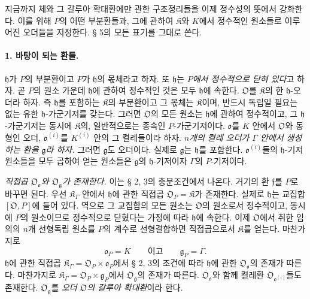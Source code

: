 지금까지 체와 그 갈루아 확대환에만 관한 구조정리들을 이제 정수성의 뜻에서 강화한다. 이를 위해 \(P\)의 어떤 부분환들과, 그에 관하여 \(\mathfrak K\)와 \(K\)에서 정수적인 원소들로 이루어진 오더들을 지정한다. § 5의 모든 표기를 그대로 쓴다.

\paragraph{1. 바탕이 되는 환들.}
\(\mathfrak h\)가 \(P\)의 부분환이고 \(P\)가 \(\mathfrak h\)의 몫체라고 하자. 또 \(\mathfrak h\)는 \emph{\(P\)에서 정수적으로 닫혀 있다}고 하자. 곧 \(P\)의 원소 가운데 \(\mathfrak h\)에 관하여 정수적인 것은 모두 \(\mathfrak h\)에 속한다. \(\mathfrak O\)를 \(\mathfrak K\)의 한 \(\mathfrak h\)-오더라 하자. 즉 \(\mathfrak h\)를 포함하는 \(\mathfrak K\)의 부분환이고 그 몫체는 \(\mathfrak K\)이며, 반드시 독립일 필요는 없는 유한 \(\mathfrak h\)-가군기저를 갖는다. 그러면 \(\mathfrak O\)의 모든 원소는 \(\mathfrak h\)에 관하여 정수적이고, 그 \(\mathfrak h\)-가군기저는 동시에 \(\mathfrak K\)의, 일반적으로는 종속인 \(P\)-가군기저이다. \(\mathfrak o\)를 \(K\) 안에서 \(\mathfrak O\)와 동형인 오더, \(\mathfrak o^{(i)}\)를 \(K^{(i)}\) 안의 그 켤레들이라 하자. \emph{\(n\)개의 켤레 오더가 \(\Gamma\) 안에서 생성하는 환을 \(\mathfrak g\)라 하자.} 그러면 \(\mathfrak g\)도 오더이다. 실제로 \(\mathfrak g\)는 \(\mathfrak h\)를 포함한다. \(\mathfrak o^{(i)}\)들의 \(\mathfrak h\)-기저 원소들을 모두 곱하여 얻는 원소들은 \(\mathfrak g\)의 \(\mathfrak h\)-기저이자 \(\Gamma\)의 \(P\)-기저이다.

\emph{직접곱 \(\mathfrak O_{\mathfrak o}\)와 \(\mathfrak O_{\mathfrak g}\)가 존재한다.} 이는 § 2, 3의 충분조건에서 나온다. 거기의 환 \(\mathfrak f\)를 \(P\)로 바꾸면 된다. 우선 \(\mathfrak K_\Gamma\) 안에서 \(\mathfrak h\)에 관한 직접곱 \(\mathfrak O_P=\mathfrak K\)가 존재한다. 실제로 \(\mathfrak h\)는 교집합 \([\mathfrak O,P]\)에 들어 있다. 역으로 그 교집합의 모든 원소는 \(\mathfrak O\)의 원소로서 정수적이고, 동시에 \(P\)의 원소이므로 정수적으로 닫혔다는 가정에 따라 \(\mathfrak h\)에 속한다. 이제 \(\mathfrak O\)에서 취한 임의의 \(n\)개 선형독립 원소를 \(P\)의 계수로 선형결합하면 직접곱으로서 \(\mathfrak K\)를 얻는다. 마찬가지로
\[
\mathfrak o_P=K
\qquad\text{이고}\qquad
\mathfrak g_P=\Gamma.
\]
\(\mathfrak h\)에 관한 직접곱 \(\mathfrak K_\Gamma=\mathfrak O_P\times\mathfrak o_P\)에서 § 2, 3의 조건에 따라 \(\mathfrak h\)에 관한 \(\mathfrak O_{\mathfrak o}\)의 존재가 따른다. 마찬가지로 \(\mathfrak K_\Gamma=\mathfrak O_P\times\mathfrak g_P\)에서 \(\mathfrak O_{\mathfrak g}\)의 존재가 따른다. \(\mathfrak O_{\mathfrak o}\)와 함께 켤레환 \(\mathfrak O_{\mathfrak o^{(i)}}\)들도 존재한다. \(\mathfrak O_{\mathfrak g}\)를 \emph{오더 \(\mathfrak O\)의 갈루아 확대환}이라 한다.

